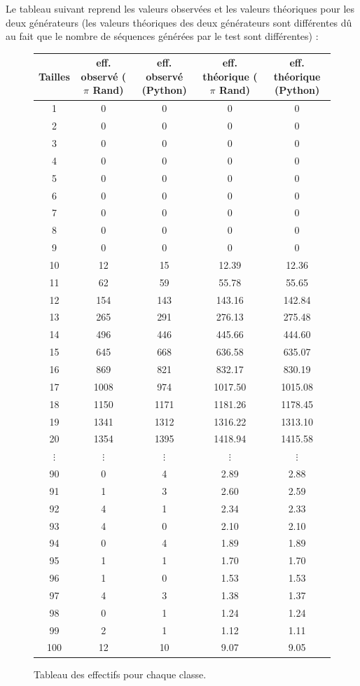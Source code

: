 \documentclass[10pt,a4paper]{article}
\begin{document}
Le tableau suivant reprend les valeurs observées et les valeurs théoriques pour les deux générateurs (les valeurs théoriques des deux générateurs sont différentes dû au fait que le nombre de séquences générées par le test sont différentes) :

\begin{figure}[H]
\begin{center}
\begin{longtable}{|c|c|c|c|c|}
\hline
Tailles & eff. observé ($\pi$ Rand) & eff. observé (Python) & eff. théorique ($\pi$ Rand) & eff. théorique (Python)\\
\hline
1 & 0 & 0&0&0\\
2 & 0 & 0&0&0\\
3 & 0 & 0&0&0\\
4 & 0 & 0&0&0\\
5 & 0 & 0&0&0\\
6 & 0 & 0&0&0\\
7 & 0 & 0&0&0\\
8 & 0 & 0&0&0\\
9 & 0 & 0&0&0\\
10 & 12 & 15 & 12.39 & 12.36\\
11 & 62 & 59 & 55.78 & 55.65\\
12 & 154 & 143 & 143.16 & 142.84\\
13 & 265 & 291 & 276.13 & 275.48\\
14 & 496 & 446 & 445.66& 444.60\\
15 & 645 & 668 & 636.58 & 635.07\\
16 & 869 & 821 & 832.17& 830.19\\
17 & 1008 & 974 & 1017.50 & 1015.08\\
18 & 1150 & 1171 & 1181.26& 1178.45\\
19 & 1341 & 1312 & 1316.22& 1313.10\\
20 & 1354 & 1395 & 1418.94 & 1415.58\\
$\vdots$ & $\vdots$ & $\vdots$ & $\vdots$ & $\vdots$\\
90 & 0 & 4 & 2.89 & 2.88\\
91 & 1 & 3 & 2.60 & 2.59\\
92 & 4 & 1 & 2.34 & 2.33\\
93 & 4 & 0 & 2.10 & 2.10\\
94 & 0 & 4 & 1.89& 1.89\\
95 & 1 & 1 & 1.70 & 1.70\\
96 & 1 & 0 & 1.53 & 1.53\\
97 & 4 & 3 & 1.38 & 1.37\\
98 & 0 & 1 & 1.24 & 1.24\\
99 & 2 & 1 & 1.12 & 1.11\\
100 & 12 & 10 & 9.07& 9.05\\
\hline
\end{longtable}
\end{center}
\caption{Tableau des effectifs pour chaque classe.}
\end{figure}
\end{document}
